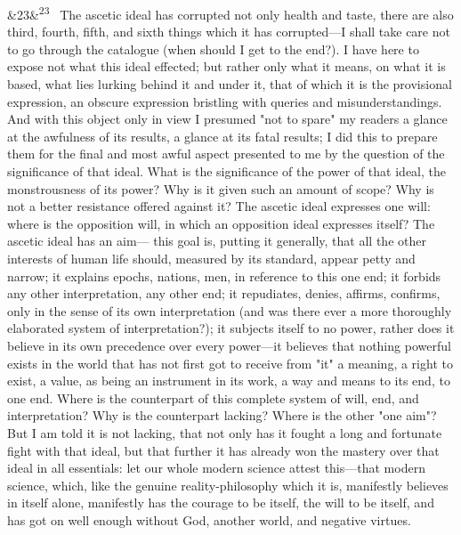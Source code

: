 \documentclass[12pt]{article}
\newcommand{\para}[1][]{\par\noindent\ifx&#1&\else\textsuperscript{\footnotesize #1}~\fi}
\begin{document}
\para[23] The ascetic ideal has corrupted not only health and taste, there are also third, fourth, fifth, and sixth things which it has corrupted---I shall take care not to go through the catalogue (when should I get to the end?). I have here to expose not what this ideal effected; but rather only what it means, on what it is based, what lies lurking behind it and under it, that of which it is the provisional expression, an obscure expression bristling with queries and misunderstandings. And with this object only in view I presumed "not to spare" my readers a glance at the awfulness of its results, a glance at its fatal results; I did this to prepare them for the final and most awful aspect presented to me by the question of the significance of that ideal. What is the significance of the power of that ideal, the monstrousness of its power? Why is it given such an amount of scope? Why is not a better resistance offered against it? The ascetic ideal expresses one will: where is the opposition will, in which an opposition ideal expresses itself? The ascetic ideal has an aim--- this goal is, putting it generally, that all the other interests of human life should, measured by its standard, appear petty and narrow; it explains epochs, nations, men, in reference to this one end; it forbids any other interpretation, any other end; it repudiates, denies, affirms, confirms, only in the sense of its own interpretation (and was there ever a more thoroughly elaborated system of interpretation?); it subjects itself to no power, rather does it believe in its own precedence over every power---it believes that nothing powerful exists in the world that has not first got to receive from "it" a meaning, a right to exist, a value, as being an instrument in its work, a way and means to its end, to one end. Where is the counterpart of this complete system of will, end, and interpretation? Why is the counterpart lacking? Where is the other "one aim"? But I am told it is not lacking, that not only has it fought a long and fortunate fight with that ideal, but that further it has already won the mastery over that ideal in all essentials: let our whole modern science attest this---that modern science, which, like the genuine reality-philosophy which it is, manifestly believes in itself alone, manifestly has the courage to be itself, the will to be itself, and has got on well enough without God, another world, and negative virtues.
\end{document}
